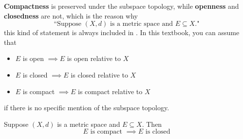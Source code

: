 \bigskip

\begin{remark}
  \textbf{Compactness} is preserved under the subspace topology, while
  \textbf{openness} and \textbf{closedness} are not, which is the reason why
  \[
    \text{``Suppose $(X, d)$ is a metric space and $E \subseteq X$."}
  \]
  this kind of statement is always included in .
  In this textbook, you can assume that
  \begin{itemize}
    \item $E$ is open $\implies E$ is open relative to $X$
    \item $E$ is closed $\implies E$ is closed relative to $X$
    \item $E$ is compact $\implies E$ is compact relative to $X$
  \end{itemize}
  if there is no specific mention of the subspace topology.
\end{remark}

\bigskip

\begin{theorem} \label{an:thm:compact-set-is-closed}
  Suppose $(X, d)$ is a metric space and $E \subseteq X$. Then
  \[
    E \text{ is compact } \implies E \text{ is closed}
  \]
\end{theorem}

